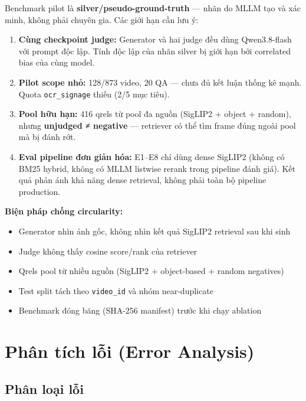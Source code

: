 \documentclass[12pt,a4paper,onecolumn]{article}
\begin{document}
Benchmark pilot là \textbf{silver/pseudo-ground-truth} — nhãn do MLLM tạo và xác minh, không phải chuyên gia. Các giới hạn cần lưu ý:

\begin{enumerate}
  \item \textbf{Cùng checkpoint judge:} Generator và hai judge đều dùng Qwen3.8-flash với prompt độc lập. Tính độc lập của nhãn silver bị giới hạn bởi correlated bias của cùng model.
  \item \textbf{Pilot scope nhỏ:} 128/873 video, 20 QA — chưa đủ kết luận thống kê mạnh. Quota \texttt{ocr\_signage} thiếu (2/5 mục tiêu).
  \item \textbf{Pool hữu hạn:} 416 qrels từ pool đa nguồn (SigLIP2 + object + random), nhưng \textbf{unjudged ≠ negative} — retriever có thể tìm frame đúng ngoài pool mà bị đánh rớt.
  \item \textbf{Eval pipeline đơn giản hóa:} E1–E8 chỉ dùng dense SigLIP2 (không có BM25 hybrid, không có MLLM listwise rerank trong pipeline đánh giá). Kết quả phản ánh khả năng dense retrieval, không phải toàn bộ pipeline production.
\end{enumerate}


\textbf{Biện pháp chống circularity:}

\begin{itemize}
  \item Generator nhìn ảnh gốc, không nhìn kết quả SigLIP2 retrieval sau khi sinh
  \item Judge không thấy cosine score/rank của retriever
  \item Qrels pool từ nhiều nguồn (SigLIP2 + object-based + random negatives)
  \item Test split tách theo \texttt{video\_id} và nhóm near-duplicate
  \item Benchmark đóng băng (SHA-256 manifest) trước khi chạy ablation
\end{itemize}


\section{Phân tích lỗi (Error Analysis)}

\subsection{Phân loại lỗi}
\end{document}
